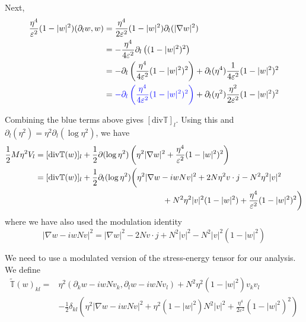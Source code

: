 \documentclass[a4paper]{article}
\renewcommand{\div}{\mathrm{div}}
\begin{document}
Next,
\begin{align}
  \frac{\eta^4}{\varepsilon^2} (1-|w|^2) (\partial_l w, w) &= \frac{\eta^4}{2 \varepsilon^2 } (1 - |w|^2) \partial_l ( |\nabla w|^2 ) \nonumber \\
  &= - \frac{\eta^4}{4 \varepsilon^2} \partial_l \left( (1-|w|^2)^2 \right) \nonumber \\
  &= - \partial_l \left( \frac{\eta^4}{4 \varepsilon^2} (1-|w|^2)^2 \right) + \partial_l (\eta^4) \frac{1}{4 \varepsilon^2} (1-|w|^2)^2 \nonumber \\
  &= { \color{blue} - \partial_l \left( \frac{\eta^4}{4 \varepsilon^2} (1-|w|^2)^2 \right) } + \partial_l (\eta^2) \frac{\eta^2}{2 \varepsilon^2}
  (1-|w|^2)^2
  \label{eq:V_l_term2}
\end{align}

Combining the blue terms above gives $[\div \mathbb{T}]_l$. Using this and $\partial_l (\eta^2) = \eta^2 \partial_l (\log \eta^2)$, we have
\begin{align}
  \frac{1}{2} M \eta^2 V_l &= [ \div \mathbb{T}(w) ]_l + \frac{1}{2} \partial(\log \eta^2) \left( \eta^2 |\nabla w|^2 + \frac{\eta^4}{\varepsilon^2}
  (1-|w|^2)^2 \right) \nonumber \\
  &= [ \div \mathbb{T}(w) ]_l + \frac{1}{2} \partial_l (\log \eta^2) \bigg( \eta^2 | \nabla w - i w N v |^2 + 2 N \eta^2 v \cdot j - N^2 \eta^2 |v|^2
  \nonumber \\
  &\hspace{5.5cm} + N^2 \eta^2 |v|^2 (1-|w|^2) + \frac{\eta^4}{\varepsilon^2} (1-|w|^2)^2 \bigg)
  \label{eq:V_l-final}
\end{align}
where we have also used the modulation identity
\begin{equation}
  | \nabla w - i w N v |^2 = |\nabla w|^2 - 2N v \cdot j + N^2 |v|^2 - N^2 |v|^2 (1-|w|^2)
  \label{eq:mod_identity}
\end{equation}

We need to use a modulated version of the stress-energy tensor for our analysis. We define
\begin{align}
  \tilde{\mathbb{T}}(w)_{kl} = &\eta^2 (\partial_k w - i w N v_k, \partial_l w - i w N v_l) + N^2 \eta^2 (1-|w|^2)v_k v_l \nonumber \\
  &- \frac{1}{2} \delta_{kl} \left( \eta^2 |\nabla w - i w N v|^2 + \eta^2 (1-|w|^2)N^2|v|^2 + \frac{\eta^4}{2 \varepsilon^2} (1-|w|^2)^2 \right)
  \label{def:mod_stress-energy}
\end{align}
\end{document}
